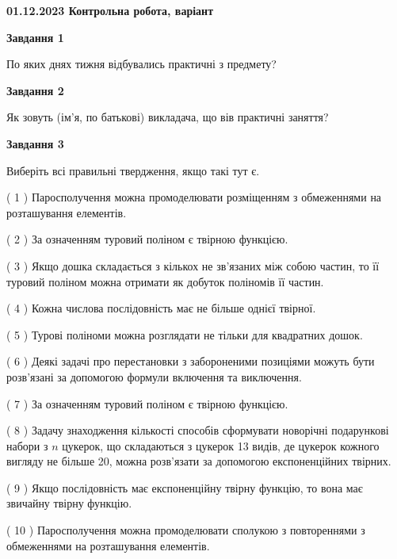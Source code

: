 \documentclass[12pt, ukrainian]{article}
\begin{document}
\begin {large}

\textbf{01.12.2023 Контрольна робота, варіант  }\par


{
{\begin {center}\textbf{Завдання 1}\end {center}}\par
По яких днях тижня відбувались практичні з предмету?\par
{\begin {center}\textbf{Завдання 2}\end {center}}\par
Як зовуть (ім'я, по батькові) викладача, що вів практичні заняття?\par
{\begin {center}\textbf{Завдання 3}\end {center}}\par
Виберіть всі правильні твердження, якщо такі тут є.\par
\vspace{2mm}
( 1 ) Паросполучення можна промоделювати розміщенням з обмеженнями на розташування елементів.%

( 2 ) За означенням туровий поліном є твірною функцією.%

( 3 ) Якщо дошка складається з кількох не зв’язаних між собою частин, то її туровий поліном можна отримати як добуток поліномів її частин.%

( 4 ) Кожна числова послідовність має не більше однієї твірної.%

( 5 ) Турові поліноми можна розглядати не тільки для квадратних дошок.%

( 6 ) Деякі задачі про перестановки з забороненими позиціями можуть бути розв’я\-за\-ні за допомогою формули включення та виключення.%

( 7 ) За означенням туровий поліном є твірною функцією.%

( 8 ) Задачу знаходження кількості способів сформувати новорічні подарункові набори з $n$ цукерок, що складаються з цукерок 13 видів, де цукерок кожного вигляду не більше 20, можна розв’язати за допомогою експоненційних твірних.%

( 9 ) Якщо послідовність має експоненційну твірну функцію, то вона має звичайну твірну функцію.%

( 10 ) Паросполучення можна промоделювати сполукою з повтореннями з обмеженнями на розташування елементів.%
}
\end {large}

\vspace{4mm}
\newpage
\end{document}
